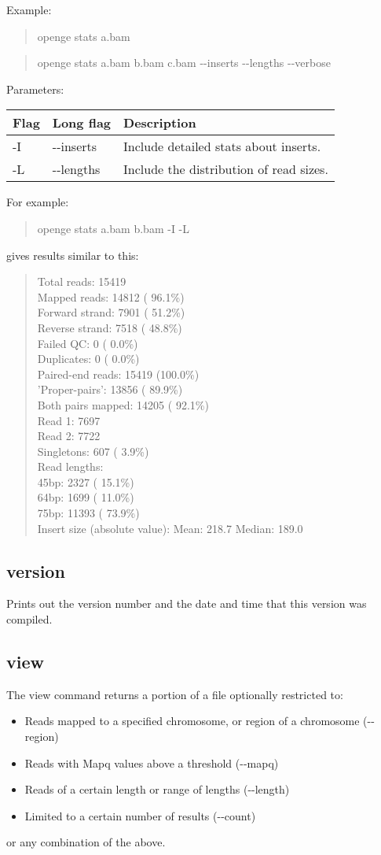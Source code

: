 \documentclass[11pt]{article}
\newcommand {\cmd}[1] {\begin{quote}#1\end{quote}}
\begin{document}
Example:

\cmd{openge stats a.bam}
\cmd{openge stats a.bam b.bam c.bam {-}{-}inserts {-}{-}lengths {-}{-}verbose}
Parameters:
\begin{center}
\begin{tabular}{llp{3.5in}}
\hline
Flag&Long flag&Description\\ \hline
-I&{-}{-}inserts&Include detailed stats about inserts.\\
-L&{-}{-}lengths&Include the distribution of read sizes.\\
\end{tabular}
\end{center}

For example:
\cmd {openge stats a.bam b.bam -I -L}
gives results similar to this:
\cmd {Total reads:            15419\\
Mapped reads:           14812 ( 96.1\%)\\
Forward strand:          7901 ( 51.2\%)\\
Reverse strand:          7518 ( 48.8\%)\\
Failed QC:                  0 (  0.0\%)\\
Duplicates:                 0 (  0.0\%)\\
Paired-end reads:       15419 (100.0\%)\\
'Proper-pairs':         13856 ( 89.9\%)\\
Both pairs mapped:      14205 ( 92.1\%)\\
Read 1:                  7697\\
Read 2:                  7722\\
Singletons:               607 (  3.9\%)\\
Read lengths:\\
    45bp:                2327 ( 15.1\%)\\
    64bp:                1699 ( 11.0\%)\\
    75bp:               11393 ( 73.9\%)\\
Insert size (absolute value):
    Mean:               218.7
    Median:             189.0}

\subsection{version}
Prints out the version number and the date and time that this version was compiled.

\subsection{view}
The view command returns a portion of a file optionally restricted to:
\begin{itemize}
\item Reads mapped to a specified chromosome, or region of a chromosome ({-}{-}region)
\item Reads with Mapq values above a threshold ({-}{-}mapq)
\item Reads of a certain length or range of lengths ({-}{-}length)
\item Limited to a certain number of results ({-}{-}count)
\end{itemize}
or any combination of the above.
\end{document}
